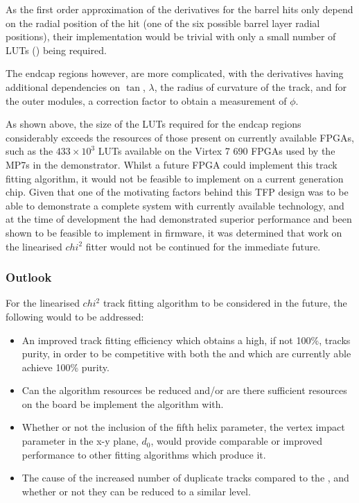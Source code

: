 As the first order approximation of the derivatives for the barrel hits only depend on the radial position of the hit (\ie one of the six possible barrel layer radial positions), their implementation would be trivial with only a small number of LUTs () being required.

The endcap regions however, are more complicated, with the derivatives having additional dependencies on $\tan$, $\lambda$, the radius of curvature of the track, and for the outer modules, a correction factor to obtain a measurement of $\phi$.



As shown above, the size of the LUTs required for the endcap regions considerably exceeds the resources of those present on currently available FPGAs, such as the $433 \times 10^{3}$ LUTs available on the Virtex 7 690 FPGAs used by the MP7s in the demonstrator.
Whilst a future FPGA could implement this track fitting algorithm, it would not be feasible to implement on a current generation chip.
Given that one of the motivating factors behind this TFP design was to be able to demonstrate a complete system with currently available technology, and at the time of development the \KF had demonstrated superior performance and been shown to be feasible to implement in firmware, it was determined that work on the linearised $chi^{2}$ fitter would not be continued for the immediate future.



\subsubsection{Outlook}\label{subsubsec:chi2outlook}
For the linearised $chi^{2}$ track fitting algorithm to be considered in the future, the following would to be addressed:
\begin{itemize}
\item An improved track fitting efficiency which obtains a high, if not 100\%, tracks purity, in order to be competitive with both the \KF and \LR which are currently able achieve 100\% purity.
\item Can the algorithm resources be reduced and/or are there sufficient resources on the board be implement the algorithm with.
\item Whether or not the inclusion of the fifth helix parameter, the vertex impact parameter in the x-y plane, $d_{0}$, would provide comparable or improved performance to other fitting algorithms which produce it.
\item The cause of the increased number of duplicate tracks compared to the \KF, and whether or not they can be reduced to a similar level.
\end{itemize}

